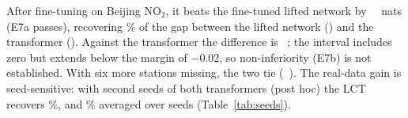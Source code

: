 After fine-tuning on Beijing NO$_2$, it beats the fine-tuned lifted network by \VthreebeijingnoTwoeZerolctvslift\
\VthreebeijingnoTwoeZerolctvsliftci\ nats (E7a passes), recovering \VthreebeijingnoTwoeZerorecovered\% of the gap
between the lifted network (\VthreebeijingnoTwoeZerovallift) and the transformer (\VthreebeijingnoTwoeZerovalpfn).
Against the transformer the difference is \VthreebeijingnoTwoeZerolctvspfn\ \VthreebeijingnoTwoeZerolctvspfnci; the
interval includes zero but extends below the margin of $-0.02$, so non-inferiority (E7b) is not established. With six
more stations missing, the two tie (\VthreebeijingnoTwoeSixlctvspfn\ \VthreebeijingnoTwoeSixlctvspfnci). The real-data
gain is seed-sensitive: with second seeds of both transformers (post hoc) the LCT recovers
\Vthreeseedtworecovered\%, and \Vthreeseedavgrecovered\% averaged over seeds (Table~\ref{tab:seeds}).

